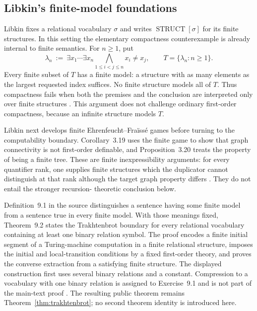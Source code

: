 
\subsection{Libkin's finite-model foundations}
\label{sec:p09-presentation-n-c-001-libkin}

Libkin fixes a relational vocabulary \(\sigma\) and writes
\(\operatorname{STRUCT}[\sigma]\) for its finite structures.  In this setting
the elementary compactness counterexample is already internal to finite
semantics.  For \(n\geq 1\), put
\[
 \lambda_n\ :=\
 \exists x_1\cdots\exists x_n
 \bigwedge_{1\leq i<j\leq n}x_i\neq x_j,
 \qquad
 T=\{\lambda_n:n\geq1\}.
\]
Every finite subset of \(T\) has a finite model: a structure with as many
elements as the largest requested index suffices.  No finite structure models
all of \(T\).  Thus compactness fails when both the premises and the conclusion
are interpreted only over finite structures
\cite[prop.~3.2]{Libkin2004}.  This argument does not challenge ordinary
first-order compactness, because an infinite structure models \(T\).

Libkin next develops finite Ehrenfeucht--Fra\"iss\'e games before turning to the
computability boundary.  Corollary~3.19 uses the finite game to show that graph
connectivity is not first-order definable, and Proposition~3.20 treats the
property of being a finite tree.  These are finite inexpressibility arguments:
for every quantifier rank, one supplies finite structures which the duplicator
cannot distinguish at that rank although the target graph property differs
\cite[pp.~37--40]{Libkin2004}.  They do not entail the stronger recursion-
theoretic conclusion below.

Definition~9.1 in the source distinguishes a sentence having some finite model
from a sentence true in every finite model.  With those meanings fixed,
Theorem~9.2 states the Trakhtenbrot boundary for every relational vocabulary
containing at least one binary relation symbol.  The proof encodes a finite
initial segment of a Turing-machine computation in a finite relational
structure, imposes the initial and local-transition conditions by a fixed
first-order theory, and proves the converse extraction from a satisfying
finite structure.  The displayed construction first uses several binary
relations and a constant.  Compression to a vocabulary with one binary
relation is assigned to Exercise~9.1 and is not part of the main-text proof
\cite[pp.~165--174]{Libkin2004}.  The resulting public theorem remains
Theorem~\ref{thm:trakhtenbrot}; no second theorem identity is introduced here.

